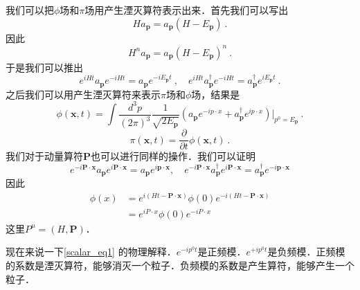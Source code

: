 我们可以把$\phi$场和$\pi$场用产生湮灭算符表示出来．首先我们可以写出
\begin{equation}
H a_{\mathbf p} = a_{\mathbf p} (H - E_{\mathbf p})~.
\end{equation}
因此
\begin{equation}
H^n a_{\mathbf p} = a_{\mathbf p} (H - E_{\mathbf p})^n~.
\end{equation}
于是我们可以推出
\begin{equation}
e^{iHt} a_{\mathbf p} e^{-iHt} = a_{\mathbf p} e^{-i E_{\mathbf p}t}~, \quad e^{iHt} a^\dagger_{\mathbf p} e^{-iHt} = a^\dagger_{\mathbf p} e^{iE_{\mathbf p}t} ~.
\end{equation}
之后我们可以用产生湮灭算符来表示$\pi$场和$\phi$场，结果是
\begin{equation}\label{scalar_eq1}
\phi(\mathbf x,t)= \int \frac{d^3 p }{(2\pi)^3} \frac{1}{\sqrt{2E_{\mathbf p}}} (a_{\mathbf p} e^{-i p \cdot x} + a^\dagger_{\mathbf p} e^{i p \cdot x}) \bigg|_{p^0 = E_{\mathbf p}}~.
\end{equation}
\begin{equation}
\pi(\mathbf x, t) = \frac{\partial}{\partial t} \phi(\mathbf x, t)~.
\end{equation}
我们对于动量算符$\mathbf P$也可以进行同样的操作．我们可以证明
\begin{equation}
e^{-i \mathbf{P} \cdot \mathbf{x}} a_{\mathbf{p}} e^{i \mathbf{P} \cdot \mathbf{x}}=a_{\mathbf{p}} e^{i \mathbf{p} \cdot \mathbf{x}}, \quad e^{-i \mathbf{P} \cdot \mathbf{x}} a_{\mathbf{p}}^{\dagger} e^{i \mathbf{P} \cdot \mathbf{x}}=a_{\mathbf{p}}^{\dagger} e^{-i \mathbf{p} \cdot \mathbf{x}}
\end{equation}
因此
\begin{equation}
\begin{aligned}
\phi(x) &=e^{i(H t-\mathbf{P} \cdot \mathbf{x})} \phi(0) e^{-i(H t-\mathbf{P} \cdot \mathbf{x})} \\
&=e^{i P \cdot x} \phi(0) e^{-i P \cdot x}
\end{aligned}
\end{equation}
这里$P^\mu = (H,\mathbf P)$．

现在来说一下\autoref{scalar_eq1} 的物理解释．$e^{-i p^0 t}$是正频模．$e^{+i p^0 t}$是负频模．正频模的系数是湮灭算符，能够消灭一个粒子．负频模的系数是产生算符，能够产生一个粒子．


